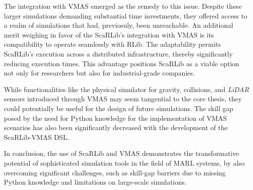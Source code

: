 \documentclass[12pt,a4paper,openright,twoside]{book}
\begin{document}
The integration with VMAS emerged as the remedy to this issue. Despite these larger simulations demanding substantial time investments, they offered access to a realm of simulations that had, previosuly, been unreachable. An additional merit weighing in favor of the ScaRLib's integration with VMAS is its compatibility to operate seamlessly with RLib. The adaptability permits ScaRLib's execution across a distributed infrastructure, thereby significantly reducing execution times. This advantage positions ScaRLib as a viable option not only for researchers but also for industrial-grade companies.

While functionalities like the physical simulator for gravity, collisions, and \emph{LiDAR} sensors introduced through VMAS may seem tangential to the core thesis, they could potentially be useful for the design of future simulations. The skill gap posed by the need for Python knowledge for the implementation of VMAS scenarios has also been significantly decreased with the development of the ScaRLib-VMAS DSL.

In conclusion, the use of ScaRLib and VMAS demonstrates the transformative potential of sophisticated simulation tools in the field of MARL systems, by also overcoming significant challenges, such as skill-gap barriers due to missing Python knowledge and limitations on large-scale simulations.

%
%
\printbibliography %
\end{document}
